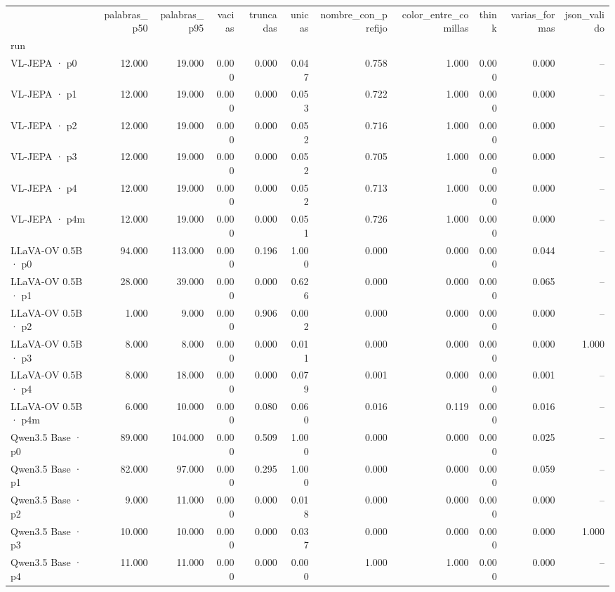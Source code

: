 \begin{tabular}{lrrrrrrrrrr}
\toprule
 & palabras\_p50 & palabras\_p95 & vacias & truncadas & unicas & nombre\_con\_prefijo & color\_entre\_comillas & think & varias\_formas & json\_valido \\
run &  &  &  &  &  &  &  &  &  &  \\
\midrule
VL-JEPA · p0 & 12.000 & 19.000 & 0.000 & 0.000 & 0.047 & 0.758 & 1.000 & 0.000 & 0.000 & -- \\
VL-JEPA · p1 & 12.000 & 19.000 & 0.000 & 0.000 & 0.053 & 0.722 & 1.000 & 0.000 & 0.000 & -- \\
VL-JEPA · p2 & 12.000 & 19.000 & 0.000 & 0.000 & 0.052 & 0.716 & 1.000 & 0.000 & 0.000 & -- \\
VL-JEPA · p3 & 12.000 & 19.000 & 0.000 & 0.000 & 0.052 & 0.705 & 1.000 & 0.000 & 0.000 & -- \\
VL-JEPA · p4 & 12.000 & 19.000 & 0.000 & 0.000 & 0.052 & 0.713 & 1.000 & 0.000 & 0.000 & -- \\
VL-JEPA · p4m & 12.000 & 19.000 & 0.000 & 0.000 & 0.051 & 0.726 & 1.000 & 0.000 & 0.000 & -- \\
LLaVA-OV 0.5B · p0 & 94.000 & 113.000 & 0.000 & 0.196 & 1.000 & 0.000 & 0.000 & 0.000 & 0.044 & -- \\
LLaVA-OV 0.5B · p1 & 28.000 & 39.000 & 0.000 & 0.000 & 0.626 & 0.000 & 0.000 & 0.000 & 0.065 & -- \\
LLaVA-OV 0.5B · p2 & 1.000 & 9.000 & 0.000 & 0.906 & 0.002 & 0.000 & 0.000 & 0.000 & 0.000 & -- \\
LLaVA-OV 0.5B · p3 & 8.000 & 8.000 & 0.000 & 0.000 & 0.011 & 0.000 & 0.000 & 0.000 & 0.000 & 1.000 \\
LLaVA-OV 0.5B · p4 & 8.000 & 18.000 & 0.000 & 0.000 & 0.079 & 0.001 & 0.000 & 0.000 & 0.001 & -- \\
LLaVA-OV 0.5B · p4m & 6.000 & 10.000 & 0.000 & 0.080 & 0.060 & 0.016 & 0.119 & 0.000 & 0.016 & -- \\
Qwen3.5 Base · p0 & 89.000 & 104.000 & 0.000 & 0.509 & 1.000 & 0.000 & 0.000 & 0.000 & 0.025 & -- \\
Qwen3.5 Base · p1 & 82.000 & 97.000 & 0.000 & 0.295 & 1.000 & 0.000 & 0.000 & 0.000 & 0.059 & -- \\
Qwen3.5 Base · p2 & 9.000 & 11.000 & 0.000 & 0.000 & 0.018 & 0.000 & 0.000 & 0.000 & 0.000 & -- \\
Qwen3.5 Base · p3 & 10.000 & 10.000 & 0.000 & 0.000 & 0.037 & 0.000 & 0.000 & 0.000 & 0.000 & 1.000 \\
Qwen3.5 Base · p4 & 11.000 & 11.000 & 0.000 & 0.000 & 0.000 & 1.000 & 1.000 & 0.000 & 0.000 & -- \\

\end{tabular}

